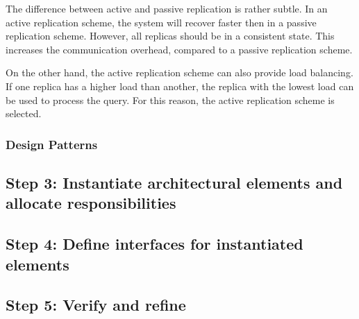 \npar The difference between active and passive replication is rather subtle.
In an active replication scheme, the system will recover faster then in a
passive replication scheme. However, all replicas should be in a consistent
state. This increases the communication overhead, compared to a passive
replication scheme.

\npar On the other hand, the active replication scheme can also provide load
balancing. If one replica has a higher load than another, the replica with the
lowest load can be used to process the query. For this reason, the active
replication scheme is selected.

\subsubsection{Design Patterns}
\label{add:it4/patterns}

\subsection{Step 3: Instantiate architectural elements and allocate responsibilities}
\label{add:it4/elements}

\subsection{Step 4: Define interfaces for instantiated elements}
\label{add:it4/interfaces}

\subsection{Step 5: Verify and refine}
\label{add:it4/verification}